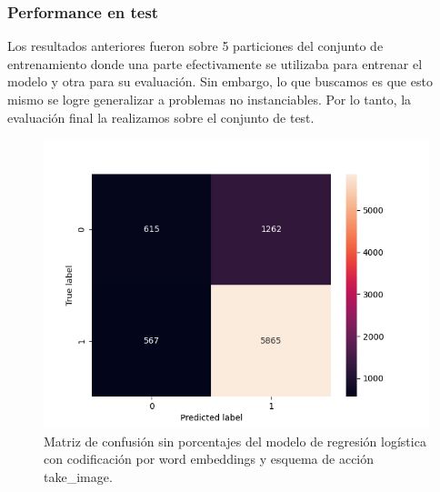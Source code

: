 \subsubsection{Performance en test}

Los resultados anteriores fueron sobre 5 particiones del conjunto
de entrenamiento donde una parte efectivamente se utilizaba para entrenar
el modelo y otra para su evaluación. Sin embargo, lo que buscamos es
que esto mismo se logre generalizar a problemas no instanciables. Por
lo tanto, la evaluación final la realizamos sobre el conjunto de test.

\begin{figure}
    \centering
    \includegraphics[scale=0.7]{figures/results/word_embeddings/lgr/take_image/lgr_set_6_confusion_matrix_raw.png}
    \caption{Matriz de confusión sin porcentajes del modelo de regresión logística con codificación por word embeddings y esquema de acción take\_image.}
    \label{fig:takeimage-bestmodel-cm-raw}
\end{figure}

